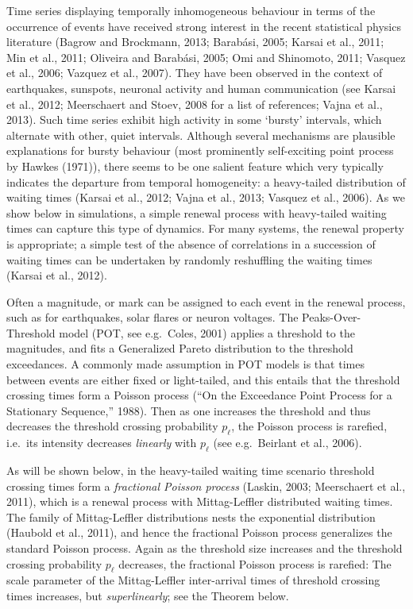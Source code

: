 \documentclass[]{elsarticle} %
\begin{document}
Time series displaying temporally inhomogeneous behaviour in terms of
the occurrence of events have received strong interest in the recent
statistical physics literature (Bagrow and Brockmann, 2013; Barabási,
2005; Karsai et al., 2011; Min et al., 2011; Oliveira and Barabási,
2005; Omi and Shinomoto, 2011; Vasquez et al., 2006; Vazquez et al.,
2007). They have been observed in the context of earthquakes, sunspots,
neuronal activity and human communication (see Karsai et al., 2012;
Meerschaert and Stoev, 2008 for a list of references; Vajna et al.,
2013). Such time series exhibit high activity in some `bursty'
intervals, which alternate with other, quiet intervals. Although several
mechanisms are plausible explanations for bursty behaviour (most
prominently self-exciting point process by Hawkes (1971)), there seems
to be one salient feature which very typically indicates the departure
from temporal homogeneity: a heavy-tailed distribution of waiting times
(Karsai et al., 2012; Vajna et al., 2013; Vasquez et al., 2006). As we
show below in simulations, a simple renewal process with heavy-tailed
waiting times can capture this type of dynamics. For many systems, the
renewal property is appropriate; a simple test of the absence of
correlations in a succession of waiting times can be undertaken by
randomly reshuffling the waiting times (Karsai et al., 2012).

Often a magnitude, or mark can be assigned to each event in the renewal
process, such as for earthquakes, solar flares or neuron voltages. The
Peaks-Over-Threshold model (POT, see e.g.~Coles, 2001) applies a
threshold to the magnitudes, and fits a Generalized Pareto distribution
to the threshold exceedances. A commonly made assumption in POT models
is that times between events are either fixed or light-tailed, and this
entails that the threshold crossing times form a Poisson process (``On
the Exceedance Point Process for a Stationary Sequence,'' 1988). Then as
one increases the threshold and thus decreases the threshold crossing
probability \(p_{\ell}\), the Poisson process is rarefied, i.e.~its
intensity decreases \emph{linearly} with \(p_{\ell}\) (see e.g.~Beirlant
et al., 2006).

As will be shown below, in the heavy-tailed waiting time scenario
threshold crossing times form a \emph{fractional Poisson process}
(Laskin, 2003; Meerschaert et al., 2011), which is a renewal process
with Mittag-Leffler distributed waiting times. The family of
Mittag-Leffler distributions nests the exponential distribution (Haubold
et al., 2011), and hence the fractional Poisson process generalizes the
standard Poisson process. Again as the threshold size increases and the
threshold crossing probability \(p_{\ell}\) decreases, the fractional
Poisson process is rarefied: The scale parameter of the Mittag-Leffler
inter-arrival times of threshold crossing times increases, but
\emph{superlinearly}; see the Theorem below.
\end{document}
